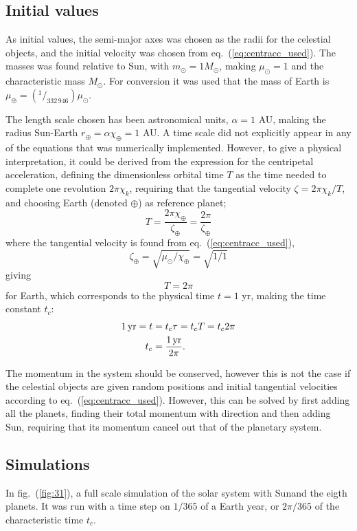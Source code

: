 \documentclass[a4paper,11pt]{article}
\begin{document}
\subsection{Initial values}
As initial values, the semi-major axes was chosen as the radii for the celestial objects, and the initial velocity was chosen from eq.~(\ref{eq:centracc_used}). The masses was found relative to Sun, with $m_\odot = 1 M_\odot$, making $\mu_\odot = 1$ and the characteristic mass $M_\odot$. For conversion it was used that the mass of Earth is $\mu_\oplus = (^1\!/_{332\,946}) \mu_\odot$.

The length scale chosen has been astronomical units, $\alpha = 1$ AU, making the radius Sun-Earth $r_{\oplus} = \alpha \chi_\oplus = 1$ AU. A time scale did not explicitly appear in any of the equations that was numerically implemented. However, to give a physical interpretation, it could be derived from the expression for the centripetal acceleration, defining the dimensionless orbital time $T$ as the time needed to complete one revolution $2 \pi \chi_k$, requiring that the tangential velocity $\zeta = 2\pi \chi_k / T$, and choosing Earth (denoted $\oplus$) as reference planet;
\[ T = \frac{2\pi \chi_\oplus}{\zeta_\oplus} = \frac{2 \pi}{\zeta_\oplus} \]
where the tangential velocity is found from eq.~(\ref{eq:centracc_used}),
\[ \zeta_\oplus = \sqrt{\mu_\odot/\chi_\oplus} = \sqrt{1/1} \]
giving
\[ T = 2\pi \]
for Earth, which corresponds to the physical time $t = 1$ yr, making the time constant $t_c$:
\begin{align}
    1\, {\rm yr} = t &= t_c \tau = t_c T = t_c 2\pi \notag \\
    t_c &= \frac{1\rm\, yr}{2\pi}. 
    \label{eq:time}
\end{align}

The momentum in the system should be conserved, however this is not the case if the celestial objects are given random positions and initial tangential velocities according to eq.~(\ref{eq:centracc_used}). However, this can be solved by first adding all the planets, finding their total momentum with direction and then adding Sun, requiring that its momentum cancel out that of the planetary system.

\subsection{Simulations}
In fig.~(\ref{fig:31}), a full scale simulation of the solar system with Sunand the eigth planets. It was run with a time step on $1/365$ of a Earth year, or $2\pi /365$ of the characteristic time $t_c$. 
\end{document}
